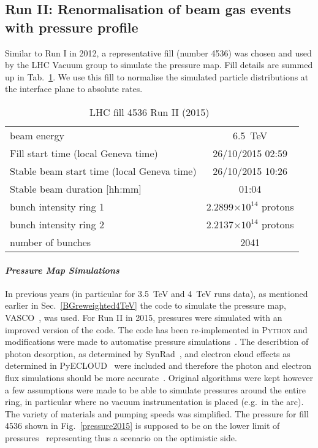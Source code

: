 \subsection{Run II: Renormalisation of beam gas events with pressure profile}

Similar to Run I in 2012, a representative fill (number 4536) was chosen and used by the LHC Vacuum group to simulate the pressure map. Fill details are summed up in Tab.~\ref{tab:fillRunII}. We use this fill to normalise the simulated particle distributions at the interface plane to absolute rates.

\begin{table}
   \centering
   \caption{LHC fill 4536 Run II (2015)~\cite{refAccStats}}
   \begin{tabular}{l||c}
       \hline
       beam energy  & 6.5~TeV \\
       Fill start time (local Geneva time) & 26/10/2015 02:59\\
       Stable beam start time (local Geneva time) & 26/10/2015 10:26\\
       Stable beam duration [hh:mm] & 01:04\\
       bunch intensity ring 1& 2.2899$\times 10^{14}$ protons\\
       bunch intensity ring 2& 2.2137$\times 10^{14}$ protons\\
       number of bunches & 2041 \\
       \hline
   \end{tabular}
   \label{tab:fillRunII}
\end{table}

\paragraph{\textit{Pressure Map Simulations}}
In previous years (in particular for 3.5~TeV and 4~TeV runs data), as mentioned earlier in Sec.~\ref{BGreweighted4TeV} the code to simulate the pressure map, \textsc{VASCO}~\cite{vascoRef}, was used. For Run II in 2015, pressures were simulated with an improved version of the code. The code has been re-implemented in \textsc{Python} and modifications were made to automatise pressure simulations~\cite{christinasStudent}. The describtion of photon desorption, as determined by SynRad~\cite{synradRef}, and electron cloud effects as determined in PyECLOUD~\cite{giovanniPhd} were included and therefore the photon and electron flux simulations should be more accurate~\cite{christinaPriv}. Original algorithms were kept however a few assumptions were made to be able to simulate pressures around the entire ring, in particular where no vacuum instrumentation is placed (e.g.~in the arc). The variety of materials and pumping speeds was simplified. The pressure for fill 4536 shown in Fig.~\ref{pressure2015} is supposed to be on the lower limit of pressures~\cite{christinaPriv} representing thus a scenario on the optimistic side. 

